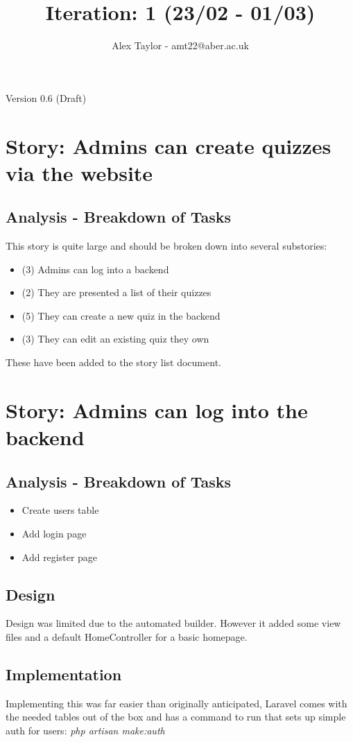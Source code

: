 \documentclass{article}
\title{Iteration: 1 (23/02 - 01/03)}
\author{Alex Taylor - amt22@aber.ac.uk}
\begin{document}
\maketitle
\begin{center}
	Version 0.6 (Draft)
\end{center}
\tableofcontents
\thispagestyle{empty}
\newpage

\section{Story: Admins can create quizzes via the website}
\subsection{Analysis - Breakdown of Tasks}
This story is quite large and should be broken down into several substories:
\begin{itemize}
	\item (3) Admins can log into a backend
	\item (2) They are presented a list of their quizzes
	\item (5) They can create a new quiz in the backend
	\item (3) They can edit an existing quiz they own
\end{itemize}
These have been added to the story list document.
\newpage

\section{Story: Admins can log into the backend}
\subsection{Analysis - Breakdown of Tasks}
\begin{itemize}
	\item Create users table
	\item Add login page
	\item Add register page
\end{itemize}
\subsection{Design}
Design was limited due to the automated builder. However it added some view files and a default HomeController for a basic homepage.
\subsection{Implementation}
Implementing this was far easier than originally anticipated, Laravel comes with the needed tables out of the box and has a command to run that sets up simple auth for users: \textit{php artisan make:auth}
\end{document}
